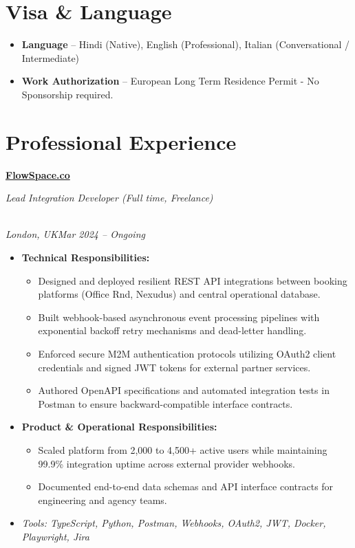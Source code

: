 \documentclass[a4paper,10pt]{article}
\newcommand{\role}[4]{\vspace{3pt}\noindent\hspace{0.6em}\parbox[t]{0.38\textwidth}{\raggedright\textbf{#1}}\hfill\parbox[t]{0.58\textwidth}{\raggedleft\textit{#2}}\\{\textit{#3}\hfill\textit{#4}}\vspace{1pt}}
\begin{document}
\section{Visa \& Language}
\begin{itemize}
\item \textbf{Language} -- Hindi (Native), English (Professional), Italian (Conversational / Intermediate)
\item \textbf{Work Authorization} -- European Long Term Residence Permit - No Sponsorship required.
\end{itemize}

\section{Professional Experience}
\role{\href{https://flowspace.co}{FlowSpace.co}}{Lead Integration Developer (Full time, Freelance)}{London, UK}{Mar 2024 -- Ongoing}
\begin{itemize}
\item \textbf{Technical Responsibilities:}
\begin{itemize}[label=--]
\item Designed and deployed resilient REST API integrations between booking platforms (Office Rnd, Nexudus) and central operational database.
\item Built webhook-based asynchronous event processing pipelines with exponential backoff retry mechanisms and dead-letter handling.
\item Enforced secure M2M authentication protocols utilizing OAuth2 client credentials and signed JWT tokens for external partner services.
\item Authored OpenAPI specifications and automated integration tests in Postman to ensure backward-compatible interface contracts.
\end{itemize}
\item \textbf{Product \& Operational Responsibilities:}
\begin{itemize}[label=--]
\item Scaled platform from 2,000 to 4,500+ active users while maintaining 99.9\% integration uptime across external provider webhooks.
\item Documented end-to-end data schemas and API interface contracts for engineering and agency teams.
\end{itemize}
\item \textit{Tools: TypeScript, Python, Postman, Webhooks, OAuth2, JWT, Docker, Playwright, Jira}
\end{itemize}
\end{document}
